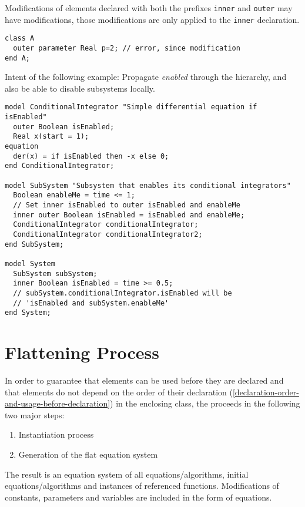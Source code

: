 Modifications of elements declared with both the prefixes \lstinline!inner! and \lstinline!outer! may have modifications, those modifications are only applied to the \lstinline!inner! declaration.

\begin{example}
\begin{lstlisting}[language=modelica]
class A
  outer parameter Real p=2; // error, since modification
end A;
\end{lstlisting}

Intent of the following example: Propagate \emph{enabled} through the hierarchy, and also be able to disable subsystems locally.
\begin{lstlisting}[language=modelica]
model ConditionalIntegrator "Simple differential equation if isEnabled"
  outer Boolean isEnabled;
  Real x(start = 1);
equation
  der(x) = if isEnabled then -x else 0;
end ConditionalIntegrator;

model SubSystem "Subsystem that enables its conditional integrators"
  Boolean enableMe = time <= 1;
  // Set inner isEnabled to outer isEnabled and enableMe
  inner outer Boolean isEnabled = isEnabled and enableMe;
  ConditionalIntegrator conditionalIntegrator;
  ConditionalIntegrator conditionalIntegrator2;
end SubSystem;

model System
  SubSystem subSystem;
  inner Boolean isEnabled = time >= 0.5;
  // subSystem.conditionalIntegrator.isEnabled will be
  // 'isEnabled and subSystem.enableMe'
end System;
\end{lstlisting}
\end{example}


\section{Flattening Process}\label{flattening-process}

In order to guarantee that elements can be used before they are declared and that elements do not depend on the order of their declaration (\cref{declaration-order-and-usage-before-declaration}) in the enclosing class, the  proceeds in the following two major steps:
\begin{enumerate}
\item
  Instantiation process
\item
  Generation of the flat equation system
\end{enumerate}

The result is an equation system of all equations/algorithms, initial equations/algorithms and instances of referenced functions.
Modifications of constants, parameters and variables are included in the form of equations.

